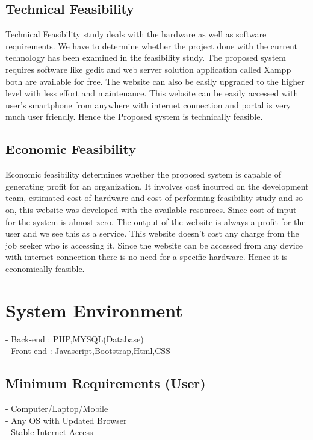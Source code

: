 \documentclass[a4paper,12pt]{report}
\begin{document}
\subsection{Technical Feasibility}

\hspace*{12pt}Technical Feasibility study deals with the hardware as well as software requirements. We have to determine whether the project done with the current technology has been examined in the feasibility study. The proposed system requires software like gedit and web server solution application called Xampp both are available for free. The website can also be easily upgraded to the higher level with less effort and maintenance. This website can be easily accessed with user's smartphone from anywhere
with internet connection and portal is very much user friendly. Hence the Proposed system is technically feasible.

\subsection{Economic Feasibility}

\hspace*{12pt}Economic feasibility determines whether the proposed system is capable of generating
profit for an organization. It involves cost incurred on the development team, estimated
cost of hardware and cost of performing feasibility study and so on, this website was developed with
the available resources. Since cost of input for the system is almost zero. The output of the website is
always a profit for the user and we see this as a service. This website doesn’t cost any charge from the job seeker who is accessing it. Since the
website can be accessed from any device with internet connection there is no need for a specific
hardware. Hence it is economically feasible.

\pagebreak

\section{System Environment}
\hspace*{12pt}
\subitem - Back-end : PHP,MYSQL(Database)\\
\subitem - Front-end : Javascript,Bootstrap,Html,CSS\\

\subsection{Minimum Requirements (User)}
\hspace*{12pt}
\subitem - Computer/Laptop/Mobile \\
\subitem - Any OS with Updated Browser \\
\subitem  - Stable Internet Access \\
\end{document}
